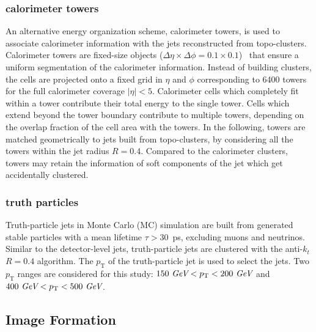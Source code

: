 \subsubsection{calorimeter towers}
An alternative energy organization scheme, calorimeter towers,
is used to associate calorimeter information with the jets
reconstructed from topo-clusters.
Calorimeter towers are fixed-size objects ($\Delta\eta\times\Delta\phi=0.1\times0.1$)~\cite{cscbook}
that ensure a uniform segmentation of the calorimeter information.
Instead of building clusters, the cells are projected onto a fixed grid in $\eta$ and $\phi$ corresponding to 6400 towers
for the full calorimeter coverage $|\eta|<5$.
Calorimeter cells which completely fit within a tower contribute their total energy
to the single tower.
Cells which extend beyond the tower boundary contribute to multiple
towers, depending on the overlap fraction of the cell area with the towers.
In the following, towers are matched geometrically to jets built from topo-clusters, by considering all the towers within
the jet radius $R=0.4$. Compared to the calorimeter clusters, towers may retain the information of soft components of the jet which get
accidentally clustered. 


\subsubsection{truth particles}
Truth-particle jets in Monte Carlo (MC) simulation are built from generated stable particles with a mean lifetime $\tau>30$~ps, 
excluding muons and neutrinos.
Similar to the detector-level jets, truth-particle jets are clustered with the anti-$k_t$ $R=0.4$ algorithm.
The $p_\text{T}$ of the truth-particle jet is used to select the jets.
Two $p_\text{T}$ ranges are considered for this study: $150~\textit{GeV}<p_\text{T}<200~\textit{GeV}$ and $400~\textit{GeV}<p_\text{T}<500~\textit{GeV}$.


\subsection{Image Formation}

